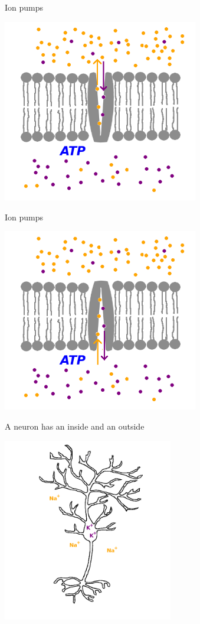 \documentclass{beamer}
\begin{document}
\begin{frame}{Ion pumps}
  \begin{center}
    \includegraphics[height=8cm]{ion_pump_1.png}
  \end{center}
\end{frame}


\begin{frame}{Ion pumps}
  \begin{center}
    \includegraphics[height=8cm]{ion_pump_2.png}
  \end{center}
\end{frame}


\begin{frame}{A neuron has an inside and an outside}
  \begin{center}
    \includegraphics[height=8cm]{ions.png}
  \end{center}
\end{frame}
\end{document}
